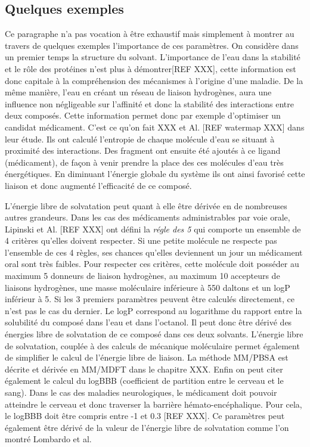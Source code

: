 \subsection{Quelques exemples}
Ce paragraphe n'a pas vocation à être exhaustif mais simplement à montrer au travers de quelques exemples l'importance de ces paramètres. On considère dans un premier temps la structure du solvant. L'importance de l'eau dans la stabilité et le rôle des protéines n'est plus à démontrer[REF XXX], cette information est donc capitale à la compréhension des mécanismes à l'origine d'une maladie. De la même manière, l'eau en créant un réseau de liaison hydrogènes, aura une influence non négligeable sur l'affinité et donc la stabilité des interactions entre deux composés. Cette information permet donc par exemple d'optimiser un candidat médicament. C'est ce qu'on fait XXX et Al. [REF watermap XXX] dans leur étude. Ils ont calculé l’entropie de chaque molécule d'eau se situant à proximité des interactions. Des fragment ont ensuite été ajoutés à ce ligand (médicament), de façon à venir prendre la place des ces molécules d'eau très énergétiques. En diminuant l'énergie globale du système ils ont ainsi favorisé cette liaison et donc augmenté l'efficacité de ce composé.

L'énergie libre de solvatation peut quant à elle être dérivée en de nombreuses autres grandeurs. Dans les cas des médicaments administrables par voie orale, Lipinski et Al. [REF XXX] ont défini la \textit{régle des 5} qui comporte un ensemble de 4 critères qu'elles doivent respecter. Si une petite molécule ne respecte pas l'ensemble de ces 4 règles, ses chances qu'elles deviennent un jour un médicament oral sont très faibles. Pour respecter ces critères, cette molécule doit posséder au maximum 5 donneurs de liaison hydrogènes, au maximum 10 accepteurs de liaisons hydrogènes, une masse moléculaire inférieure à 550 daltons et un logP inférieur à 5. Si les 3 premiers paramètres peuvent être calculés directement, ce n'est pas le cas du dernier. Le logP correspond au logarithme du rapport entre la solubilité du composé dans l'eau et dans l'octanol. Il peut donc être dérivé des énergies libre de solvatation de ce composé dans ces deux solvants. L'énergie libre de solvatation, couplée à des calculs de mécanique moléculaire permet également de simplifier le calcul de l'énergie libre de liaison. La méthode MM/PBSA\cite{Genheden__MMPBSA_2015} est décrite et dérivée en MM/MDFT dans le chapitre XXX. Enfin on peut citer également le calcul du logBBB (coefficient de partition entre le cerveau et le sang). Dans le cas des maladies neurologiques, le médicament doit pouvoir atteindre le cerveau et donc traverser la barrière hémato-encéphalique. Pour cela, le logBBB doit être compris entre -1 et 0.3 [REF XXX]. Ce paramètres peut également être dérivé de la valeur de l'énergie libre de solvatation comme l'on montré Lombardo et al\cite{Lombardo_computation_1996}.

